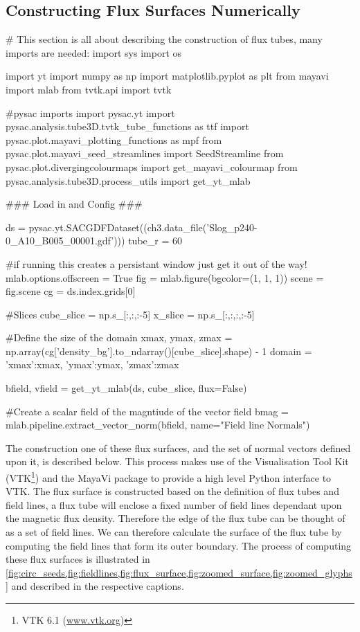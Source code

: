 \subsection{Constructing Flux Surfaces Numerically}
\begin{pycode}[chapter3]
# This section is all about describing the construction of flux tubes, many imports are needed:
import sys
import os

import yt
import numpy as np
import matplotlib.pyplot as plt
from mayavi import mlab
from tvtk.api import tvtk

#pysac imports
import pysac.yt
import pysac.analysis.tube3D.tvtk_tube_functions as ttf
import pysac.plot.mayavi_plotting_functions as mpf
from pysac.plot.mayavi_seed_streamlines import SeedStreamline
from pysac.plot.divergingcolourmaps import get_mayavi_colourmap
from pysac.analysis.tube3D.process_utils import get_yt_mlab

### Load in and Config ###

ds = pysac.yt.SACGDFDataset((ch3.data_file('Slog_p240-0_A10_B005_00001.gdf')))
tube_r = 60

#if running this creates a persistant window just get it out of the way!
mlab.options.offscreen = True
fig = mlab.figure(bgcolor=(1, 1, 1))
scene = fig.scene
cg = ds.index.grids[0]

#Slices
cube_slice = np.s_[:,:,:-5]
x_slice = np.s_[:,:,:,:-5]

#Define the size of the domain
xmax, ymax, zmax = np.array(cg['density_bg'].to_ndarray()[cube_slice].shape) - 1
domain = {'xmax':xmax, 'ymax':ymax, 'zmax':zmax}

bfield, vfield = get_yt_mlab(ds, cube_slice, flux=False)

#Create a scalar field of the magntiude of the vector field
bmag = mlab.pipeline.extract_vector_norm(bfield, name="Field line Normals")
\end{pycode}

The construction one of these flux surfaces, and the set of normal vectors defined upon it, is described below.
This process makes use of the Visualisation Tool Kit (VTK\footnote{VTK 6.1 (\url{www.vtk.org})}) and the MayaVi package \cite{Ramachandran2011} to provide a high level Python interface to VTK.
The flux surface is constructed based on the definition of flux tubes and field lines, a flux tube will enclose a fixed number of field lines dependant upon the magnetic flux density.
Therefore the edge of the flux tube can be thought of as a set of field lines.
We can therefore calculate the surface of the flux tube by computing the field lines that form its outer boundary.
The process of computing these flux surfaces is illustrated in \cref{fig:circ_seeds,fig:fieldlines,fig:flux_surface,fig:zoomed_surface,fig:zoomed_glyphs} and described in the respective captions.

